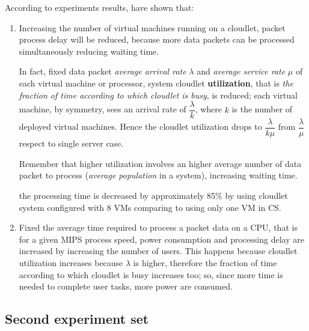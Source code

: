 \documentclass[sigchi]{acmart}
\begin{document}
According to experiments results, \cite{MSAReport} have shown that:

\begin{enumerate}

\item Increasing the number of virtual machines running on a cloudlet, packet process delay will be reduced, because more data packets can be processed simultaneously reducing waiting time.

In fact, fixed data packet \textit{average arrival rate} $\lambda$ and \textit{average service rate} $\mu$ of each virtual machine or processor, system cloudlet \textbf{utilization}, that is \textit{the fraction of time according to which cloudlet is busy}, is reduced; each virtual machine, by symmetry, sees an arrival rate of $\dfrac{\lambda}{k}$, where $k$ is the number of deployed virtual machines. Hence the cloudlet utilization drops to $\dfrac{\lambda}{k\mu}$ from $\dfrac{\lambda}{\mu}$ respect to single server case.   

Remember that higher utilization involves an higher average number of data packet to process (\textit{average population} in a system), increasing waiting time.

\vspace{0.3cm}

\begin{quoting}[font=itshape, begintext={``}, endtext={''\cite[par.~3.3]{MSAReport}}]
the processing time is decreased by approximately 85\% by using cloudlet system configured with 8 VMs comparing to using only one VM in CS.
\end{quoting}

\vspace{0.3cm}

\item Fixed the average time required to process a packet data on a CPU, that is for a given MIPS process speed, power consumption and processing delay are increased by increasing the number of users. This happens because cloudlet utilization increases because $\lambda$ is higher, therefore the fraction of time according to which cloudlet is busy increases too; so, since more time is needed to complete user tasks, more power are consumed.

\end{enumerate}

\subsection{Second experiment set}
\end{document}

